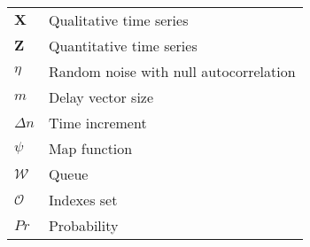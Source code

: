 \begin{table}[!htb]
\centering
  \caption*{}
\begin{tabular}{l l }
$\mathbf{X} $ & Qualitative time series \\
$\mathbf{Z} $ & Quantitative time series \\
$ \eta $ & Random noise with null autocorrelation \\
$ m $ & Delay vector size \\
$ \Delta n $ & Time increment \\
$ \psi $ & Map function \\
$ \mathcal{W} $ & Queue \\
$ \mathcal{O} $ & Indexes set\\
$ Pr $ & Probability\\
\end{tabular}
\label{tab:parameters}
\end{table}
